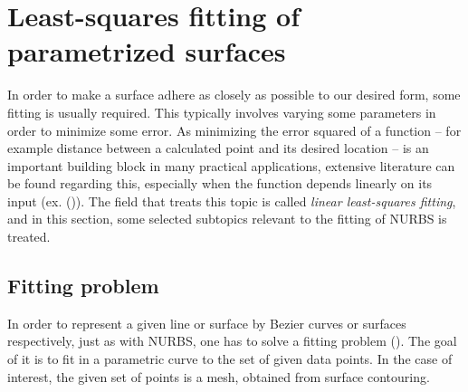 \section{Least-squares fitting of parametrized surfaces}
\label{sec:LSQfitting}
In order to make a surface adhere as closely as possible to our desired form, some fitting is usually required. This typically involves varying some parameters in order to minimize some error. As minimizing the error squared of a function -- for example distance between a calculated point and its desired location -- is an important building block in many practical applications, extensive literature can be found regarding this, especially when the function depends linearly on its input (ex. (\cite{becker2011advanced})). The field that treats this topic is called \emph{linear least-squares fitting}, and in this section, some selected subtopics relevant to the fitting of \acs{NURBS} is treated.


\subsection{Fitting problem}
In order to represent a given line or surface by Bezier curves or surfaces respectively, just as with NURBS, one has to solve a fitting problem (\cite{becker2011advanced}). The goal of it is to fit in a parametric curve to the set of given data points. In the case of interest, the given set of points is a mesh, obtained from surface contouring.


